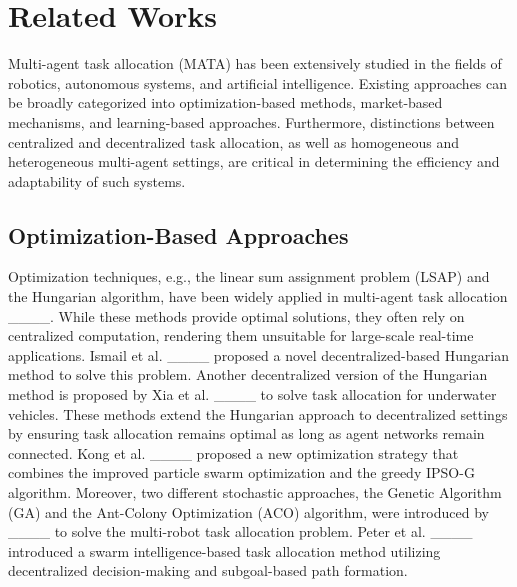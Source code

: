 \section{Related Works}
Multi-agent task allocation (MATA) has been extensively studied in the fields of robotics, autonomous systems, and artificial intelligence. Existing approaches can be broadly categorized into optimization-based methods, market-based mechanisms, and learning-based approaches. Furthermore, distinctions between centralized and decentralized task allocation, as well as homogeneous and heterogeneous multi-agent settings, are critical in determining the efficiency and adaptability of such systems.

\subsection{Optimization-Based Approaches}
Optimization techniques, e.g., the linear sum assignment problem (LSAP) and the Hungarian algorithm, have been widely applied in multi-agent task allocation ____. While these methods provide optimal solutions, they often rely on centralized computation, rendering them unsuitable for large-scale real-time applications. Ismail et al. ____ proposed a novel decentralized-based Hungarian method to solve this problem. Another decentralized version of the Hungarian method is proposed by Xia et al. ____ to solve task allocation for underwater vehicles. These methods extend the Hungarian approach to decentralized settings by ensuring task allocation remains optimal as long as agent networks remain connected. Kong et al. ____ proposed a new optimization strategy that combines the improved particle swarm optimization and the greedy IPSO-G algorithm. Moreover, two different stochastic approaches, the Genetic Algorithm (GA) and the Ant-Colony Optimization (ACO) algorithm, were introduced by ____ to solve the multi-robot task allocation problem. Peter et al. ____ introduced a swarm intelligence-based task allocation method utilizing decentralized decision-making and subgoal-based path formation.

